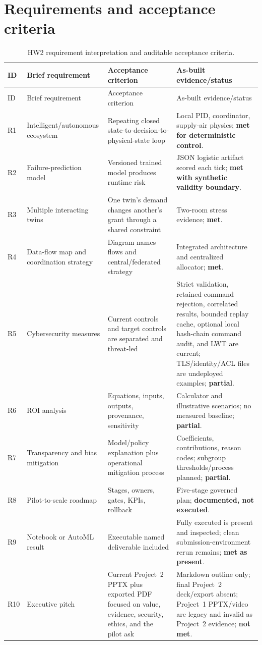 \section{Requirements and acceptance criteria}
\begin{longtable}{L{0.07\textwidth}L{0.27\textwidth}L{0.30\textwidth}L{0.25\textwidth}}
\caption{HW2 requirement interpretation and auditable acceptance criteria.}\label{tab:req}\\
\toprule
ID & Brief requirement & Acceptance criterion & As-built evidence/status \\
\midrule
\endfirsthead
\toprule ID & Brief requirement & Acceptance criterion & As-built evidence/status \\
\midrule\endhead
R1 & Intelligent/autonomous ecosystem & Repeating closed state-to-decision-to-physical-state loop & Local PID, coordinator, supply-air physics; \textbf{met for deterministic control}. \\
R2 & Failure-prediction model & Versioned trained model produces runtime risk & JSON logistic artifact scored each tick; \textbf{met with synthetic validity boundary}. \\
R3 & Multiple interacting twins & One twin's demand changes another's grant through a shared constraint & Two-room stress evidence; \textbf{met}. \\
R4 & Data-flow map and coordination strategy & Diagram names flows and central/federated strategy & Integrated architecture and centralized allocator; \textbf{met}. \\
R5 & Cybersecurity measures & Current controls and target controls are separated and threat-led & Strict validation, retained-command rejection, correlated results, bounded replay cache, optional local hash-chain command audit, and LWT are current; TLS/identity/ACL files are undeployed examples; \textbf{partial}. \\
R6 & ROI analysis & Equations, inputs, outputs, provenance, sensitivity & Calculator and illustrative scenarios; no measured baseline; \textbf{partial}. \\
R7 & Transparency and bias mitigation & Model/policy explanation plus operational mitigation process & Coefficients, contributions, reason codes; subgroup thresholds/process planned; \textbf{partial}. \\
R8 & Pilot-to-scale roadmap & Stages, owners, gates, KPIs, rollback & Five-stage governed plan; \textbf{documented, not executed}. \\
R9 & Notebook or AutoML result & Executable named deliverable included & Fully executed  is present and inspected; clean submission-environment rerun remains; \textbf{met as present}. \\
R10 & Executive pitch & Current Project~2 PPTX plus exported PDF focused on value, evidence, security, ethics, and the pilot ask & Markdown outline only; final Project~2 deck/export absent; Project~1 PPTX/video are legacy and invalid as Project~2 evidence; \textbf{not met}. \\
\bottomrule
\end{longtable}

